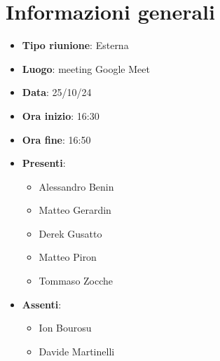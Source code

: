 \section{Informazioni generali}
\begin{itemize}
  \item \textbf{Tipo riunione}: Esterna
  \item \textbf{Luogo}: meeting Google Meet
  \item \textbf{Data}: 25/10/24
  \item \textbf{Ora inizio}: 16:30
  \item \textbf{Ora fine}: 16:50
  
  \item \textbf{Presenti}:
  \begin{itemize}
    \item Alessandro Benin
    \item Matteo Gerardin
    \item Derek Gusatto
    \item Matteo Piron
    \item Tommaso Zocche
  \end{itemize}

  \item \textbf{Assenti}:
  \begin{itemize}
      \item Ion Bourosu
      \item Davide Martinelli
  \end{itemize}
 
\end{itemize}